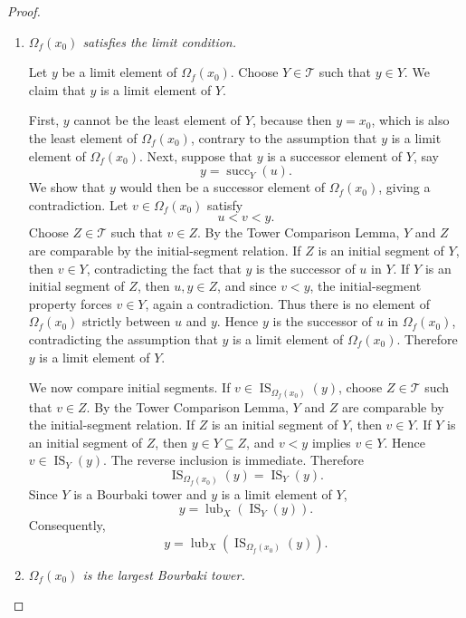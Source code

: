 \documentclass[11pt]{article}
\theoremstyle{definition}
\theoremstyle{remark}
\newcommand{\IS}{\operatorname{IS}}
\newcommand{\lub}{\operatorname{lub}}
\newcommand{\succop}{\operatorname{succ}}
\begin{document}
\begin{proof}
\begin{enumerate}
Now let \(u\in\Omega_f(x_0)\) satisfy \(y<u\). By the same comparability argument, there
is a tower in \(\mathcal T\) containing both \(y\) and \(u\). In that tower, the least
element strictly above \(y\) is \(f(y)\). Therefore
\[
f(y)\leq u.
\]
Thus \(f(y)\) is the least element of \(\Omega_f(x_0)\) strictly above \(y\). Hence
\[
\succop_{\Omega_f(x_0)}(y)=f(y).
\]

\item \emph{\(\Omega_f(x_0)\) satisfies the limit condition.}

Let \(y\) be a limit element of \(\Omega_f(x_0)\). Choose \(Y\in\mathcal T\) such that
\(y\in Y\). We claim that \(y\) is a limit element of \(Y\).

First, \(y\) cannot be the least element of \(Y\), because then \(y=x_0\), which is also
the least element of \(\Omega_f(x_0)\), contrary to the assumption that \(y\) is a limit
element of \(\Omega_f(x_0)\). Next, suppose that \(y\) is a successor element of \(Y\),
say
\[
y=\succop_Y(u).
\]
We show that \(y\) would then be a successor element of \(\Omega_f(x_0)\), giving a
contradiction. Let \(v\in\Omega_f(x_0)\) satisfy
\[
u<v<y.
\]
Choose \(Z\in\mathcal T\) such that \(v\in Z\). By the Tower Comparison Lemma, \(Y\)
and \(Z\) are comparable by the initial-segment relation. If \(Z\) is an initial segment of
\(Y\), then \(v\in Y\), contradicting the fact that \(y\) is the successor of \(u\) in
\(Y\). If \(Y\) is an initial segment of \(Z\), then \(u,y\in Z\), and since \(v<y\), the
initial-segment property forces \(v\in Y\), again a contradiction. Thus there is no element
of \(\Omega_f(x_0)\) strictly between \(u\) and \(y\). Hence \(y\) is the successor of
\(u\) in \(\Omega_f(x_0)\), contradicting the assumption that \(y\) is a limit element of
\(\Omega_f(x_0)\). Therefore \(y\) is a limit element of \(Y\).

We now compare initial segments. If \(v\in\IS_{\Omega_f(x_0)}(y)\), choose
\(Z\in\mathcal T\) such that \(v\in Z\). By the Tower Comparison Lemma, \(Y\) and \(Z\)
are comparable by the initial-segment relation. If \(Z\) is an initial segment of \(Y\),
then \(v\in Y\). If \(Y\) is an initial segment of \(Z\), then \(y\in Y\subseteq Z\), and
\(v<y\) implies \(v\in Y\). Hence \(v\in\IS_Y(y)\). The reverse inclusion is immediate.
Therefore
\[
\IS_{\Omega_f(x_0)}(y)=\IS_Y(y).
\]
Since \(Y\) is a Bourbaki tower and \(y\) is a limit element of \(Y\),
\[
y=\lub_X(\IS_Y(y)).
\]
Consequently,
\[
y=\lub_X(\IS_{\Omega_f(x_0)}(y)).
\]

\item \emph{\(\Omega_f(x_0)\) is the largest Bourbaki tower.}


\end{enumerate}
\end{proof}
\end{document}
